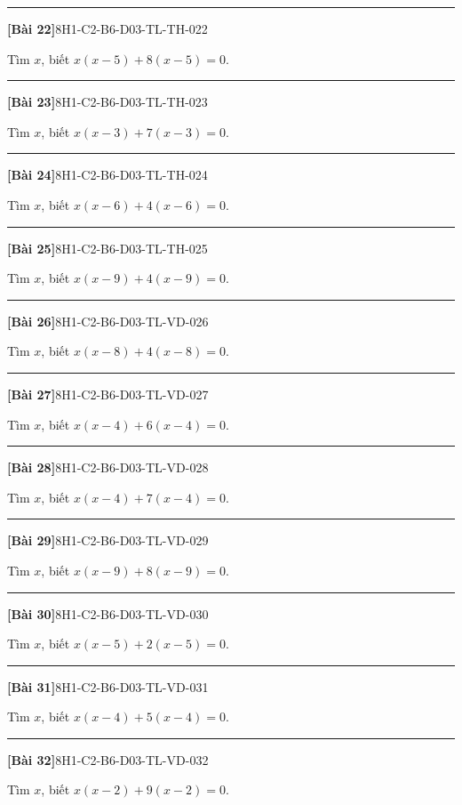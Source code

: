 \documentclass[12pt,a4paper]{article}
\newif\ifloigiai
\newenvironment{cauhoi}[2]{%
  \par\medskip\noindent\rule{\textwidth}{0.4pt}\par\nopagebreak
  \noindent\textbf{[#1]}\hfill{\scriptsize\ttfamily #2}\par\nopagebreak\smallskip}{\par}
\newcommand{\loigiai}[1]{\ifloigiai\par\smallskip\noindent\textit{Lời giải.} #1\par\fi}
\begin{document}
\begin{cauhoi}{Bài 22}{8H1-C2-B6-D03-TL-TH-022}
Tìm $x$, biết $x(x-5)+8(x-5)=0$.
\loigiai{Đặt nhân tử chung: $(x-5)(x+8)=0$. Suy ra $x=5$ hoặc $x=-8$.}
\end{cauhoi}
\begin{cauhoi}{Bài 23}{8H1-C2-B6-D03-TL-TH-023}
Tìm $x$, biết $x(x-3)+7(x-3)=0$.
\loigiai{Đặt nhân tử chung: $(x-3)(x+7)=0$. Suy ra $x=3$ hoặc $x=-7$.}
\end{cauhoi}
\begin{cauhoi}{Bài 24}{8H1-C2-B6-D03-TL-TH-024}
Tìm $x$, biết $x(x-6)+4(x-6)=0$.
\loigiai{Đặt nhân tử chung: $(x-6)(x+4)=0$. Suy ra $x=6$ hoặc $x=-4$.}
\end{cauhoi}
\begin{cauhoi}{Bài 25}{8H1-C2-B6-D03-TL-TH-025}
Tìm $x$, biết $x(x-9)+4(x-9)=0$.
\loigiai{Đặt nhân tử chung: $(x-9)(x+4)=0$. Suy ra $x=9$ hoặc $x=-4$.}
\end{cauhoi}
\begin{cauhoi}{Bài 26}{8H1-C2-B6-D03-TL-VD-026}
Tìm $x$, biết $x(x-8)+4(x-8)=0$.
\loigiai{Đặt nhân tử chung: $(x-8)(x+4)=0$. Suy ra $x=8$ hoặc $x=-4$.}
\end{cauhoi}
\begin{cauhoi}{Bài 27}{8H1-C2-B6-D03-TL-VD-027}
Tìm $x$, biết $x(x-4)+6(x-4)=0$.
\loigiai{Đặt nhân tử chung: $(x-4)(x+6)=0$. Suy ra $x=4$ hoặc $x=-6$.}
\end{cauhoi}
\begin{cauhoi}{Bài 28}{8H1-C2-B6-D03-TL-VD-028}
Tìm $x$, biết $x(x-4)+7(x-4)=0$.
\loigiai{Đặt nhân tử chung: $(x-4)(x+7)=0$. Suy ra $x=4$ hoặc $x=-7$.}
\end{cauhoi}
\begin{cauhoi}{Bài 29}{8H1-C2-B6-D03-TL-VD-029}
Tìm $x$, biết $x(x-9)+8(x-9)=0$.
\loigiai{Đặt nhân tử chung: $(x-9)(x+8)=0$. Suy ra $x=9$ hoặc $x=-8$.}
\end{cauhoi}
\begin{cauhoi}{Bài 30}{8H1-C2-B6-D03-TL-VD-030}
Tìm $x$, biết $x(x-5)+2(x-5)=0$.
\loigiai{Đặt nhân tử chung: $(x-5)(x+2)=0$. Suy ra $x=5$ hoặc $x=-2$.}
\end{cauhoi}
\begin{cauhoi}{Bài 31}{8H1-C2-B6-D03-TL-VD-031}
Tìm $x$, biết $x(x-4)+5(x-4)=0$.
\loigiai{Đặt nhân tử chung: $(x-4)(x+5)=0$. Suy ra $x=4$ hoặc $x=-5$.}
\end{cauhoi}
\begin{cauhoi}{Bài 32}{8H1-C2-B6-D03-TL-VD-032}
Tìm $x$, biết $x(x-2)+9(x-2)=0$.
\loigiai{Đặt nhân tử chung: $(x-2)(x+9)=0$. Suy ra $x=2$ hoặc $x=-9$.}
\end{cauhoi}
\end{document}
